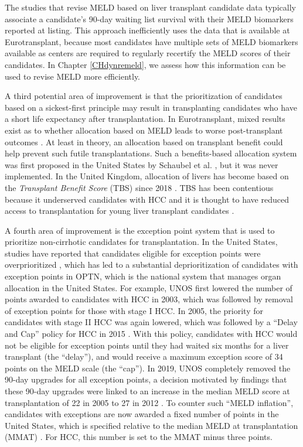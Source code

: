 \documentclass[11pt,twoside,]{book}
\begin{document}
The studies that revise MELD based on liver transplant candidate data typically
associate a candidate's 90-day waiting list survival with their MELD biomarkers
reported at listing. This approach inefficiently uses the data that is available
at Eurotransplant, because most candidates have multiple sets of MELD biomarkers
available as centers are required to regularly recertify the MELD scores of their candidates.
In Chapter \ref{CHdynremeld}, we assess how this information
can be used to revise MELD more efficiently.

A third potential area of improvement is that the prioritization of candidates based on a
sickest-first principle may result in transplanting candidates who
have a short life expectancy after transplantation. In Eurotransplant, mixed results exist as to
whether allocation based on MELD leads to worse post-transplant outcomes \citep{Nagler2005, Weismller2009}.
At least in theory, an allocation based on transplant benefit could help prevent such futile
transplantations. Such a benefits-based allocation system was first proposed in
the United States by Schaubel et al. \citep{Schaubel2009}, but it was never implemented.
In the United Kingdom, allocation of livers has become
based on the \emph{Transplant Benefit Score} (TBS) since 2018 \citep{Allen2024}. TBS has
been contentious because it underserved candidates with HCC \citep{Attia2023} and
it is thought to have reduced access to transplantation for young liver
transplant candidates \citep{Attia2024}.

A fourth area of improvement is the exception point system that is used to prioritize
non-cirrhotic candidates for transplantation. In the United States,
studies have reported that candidates eligible for exception points were overprioritized
\citep{Massie2011, Goldberg2014}, which has led to a substantial deprioritization of
candidates with exception points in OPTN, which is the national system that manages organ
allocation in the United States. For example, UNOS first lowered the number
of points awarded to candidates with HCC in 2003, which was followed by removal
of exception points for those with stage I HCC. In 2005, the priority for candidates with stage II HCC was again
lowered, which was followed by a ``Delay and Cap'' policy for HCC in 2015
\citep{pillaiLiverAllocationPolicies2019}. With this policy, candidates
with HCC would not be eligible for exception points until they had waited six months
for a liver transplant (the ``delay''), and would receive a maximum exception score of 34 points
on the MELD scale (the ``cap''). In 2019, UNOS completely removed the 90-day upgrades for all exception points,
a decision motivated by findings that these 90-day upgrades were linked to an increase in the
median MELD score at transplantation of 22 in 2005 to 27 in 2012 \citep{northupExcessMortalityLiver2015}. To counter such ``MELD inflation'', candidates
with exceptions are now awarded a fixed number of points in the United States,
which is specified relative to the median MELD at transplantation (MMAT) \citep{Bonner2018}. For HCC, this number is
set to the MMAT minus three points.
\end{document}
